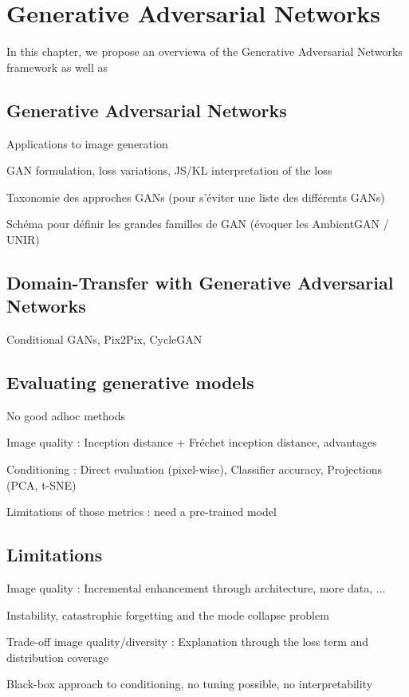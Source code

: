 \chapter{Generative Adversarial Networks}
\label{chap:chapter1}

\begin{chapterabstract}
	In this chapter, we propose an overviewa of the Generative Adversarial Networks \cite{Goodfellow2014} framework as well as 
\end{chapterabstract}

\section{Generative Adversarial Networks}
Applications to image generation

GAN formulation, loss variations, JS/KL interpretation of the loss

Taxonomie des approches GANs (pour s'éviter une liste des différents GANs)

Schéma pour définir les grandes familles de GAN (évoquer les AmbientGAN / UNIR)


\section{Domain-Transfer with Generative Adversarial Networks}

Conditional GANs, Pix2Pix, CycleGAN

\section{Evaluating generative models}

No good adhoc methods

Image quality : Inception distance + Fréchet inception distance, advantages

Conditioning : Direct evaluation (pixel-wise), Classifier accuracy, Projections (PCA, t-SNE)

Limitations of those metrics : need a pre-trained model

\section{Limitations}
Image quality : Incremental enhancement through architecture, more data, ... 

Instability, catastrophic forgetting and the mode collapse problem

Trade-off image quality/diversity : Explanation through the loss term and distribution coverage

Black-box approach to conditioning, no tuning possible, no interpretability
